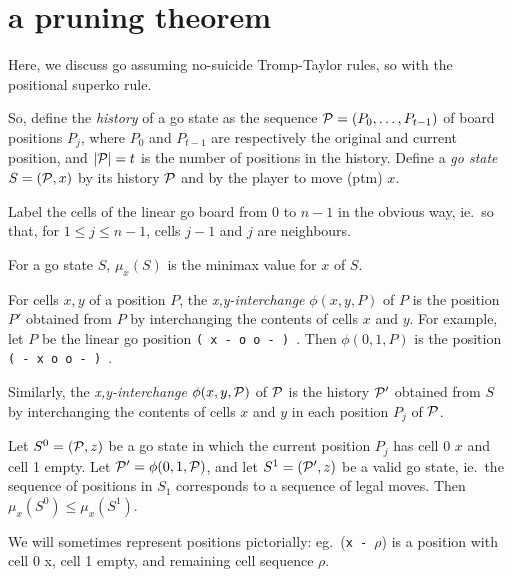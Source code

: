 \section*{a pruning theorem}
Here, we discuss go assuming no-suicide Tromp-Taylor rules,
so with the positional superko rule.

So, define the {\em history} of a go state as the sequence
${\mathcal{P}} = (P_0, \ldots, P_{t-1})$
of board positions $P_j$, 
where $P_0$ and $P_{t-1}$ 
are respectively the original and current position,
and $|{\mathcal{P}}| = t$ is the number of positions in the history.
Define a {\em go state} $S=({\mathcal{P}},x)$ by its history ${\mathcal{P}}$
and by the player to move (ptm) $x$.

Label the cells of the linear go board from 0 to $n-1$
in the obvious way, ie.\ so that,
for $1 \leq j \leq n-1$, cells $j-1$ and $j$ are neighbours.

For a go state $S$, 
$\mu_x(S)$ is the minimax value for $x$ of $S$.

For cells $x,y$ of a position $P$,
the {\em x,y-interchange} $\phi(x,y,P)$ of $P$ is
the position $P'$ obtained from $P$ by 
interchanging the contents of cells $x$ and $y$.
For example,
let $P$ be the linear go position {\tt ( x - o o - ) }.
Then $\phi(0,1,P)$ is the position {\tt ( - x o o - ) }.

Similarly,
the {\em x,y-interchange} $\phi(x,y,{\mathcal{P}})$ of ${\mathcal{P}}$
is the history ${\mathcal{P}}'$ obtained from $S$ by interchanging
the contents of cells $x$ and $y$ in each position $P_j$ of ${\mathcal{P}}$.

\begin{theorem}
Let $S^0 =({\mathcal{P}},z)$ be a go state in which the current position
$P_j$ has cell 0 $x$ and cell 1 empty.
Let ${\mathcal{P}}' = \phi(0,1,{\mathcal{P}})$, and let
$S^1 = ({\mathcal{P}}',z)$ be a valid go state, ie.\ the sequence
of positions in $S_1$ corresponds to a sequence of legal moves.
Then $\mu_x(S^0) \leq \mu_x(S^1)$.
\end{theorem}

We will sometimes represent positions pictorially:
eg.\ ({\tt x - }$\rho$) is a position with cell 0 x, cell 1 empty,
and remaining cell sequence $\rho$.

~

